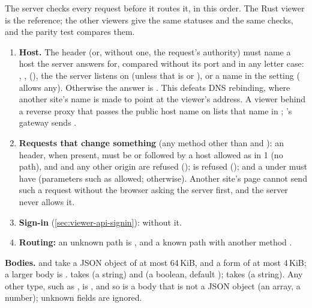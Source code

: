The server checks every request before it routes it, in this order. The Rust viewer is the
reference; the other viewers give the same statuses and the same checks, and the parity test
compares them.
\begin{enumerate}
\item \textbf{Host.} The  header (or, without one, the request's authority) must
  name a host the server answers for, compared without its port and in any letter case:
  , ,  (\code{[::1]}), the  the server
  listens on (unless that is  or \code{::}), or a name in the setting
   ( allows any). Otherwise the answer is . This
  defeats DNS rebinding, where another site's name is made to point at the viewer's address. A
  viewer behind a reverse proxy that passes the public host name on lists that name in
  ; \md{}'s gateway sends .
\item \textbf{Requests that change something} (any method other than  and
  ): an  header, when present, must be  or
   followed by a host allowed as in 1 (no path), and  and any other
  origin are refused ();  is refused ();
  and a  under  must have 
  (parameters such as  allowed;  otherwise). Another site's page
  cannot send such a request without the browser asking the server first, and the server never
  allows it.
\item \textbf{Sign-in} (\cref{sec:viewer-api-signin}):  without it.
\item \textbf{Routing:} an unknown path is , and a known path with another method
  .
\end{enumerate}

\textbf{Bodies.}  and  take a JSON object of at
most 64\,KiB, and  a form of at most 4\,KiB; a larger body is .
 takes  (a string) and  (a boolean, default );
 takes  (a string). Any other type, such as ,
is , and so is a body that is not a JSON object (an array, a number); unknown fields
are ignored.

